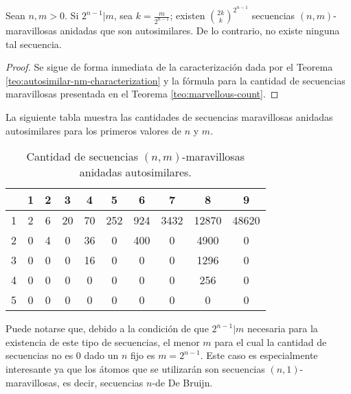 \documentclass[11pt]{article}
\begin{document}
\begin{coro} \label{coro:autosimilar-nm-count}
	Sean $n, m > 0$.
	Si $2^{n-1} \vert m$, sea $k = \frac{m}{2^{n-1}}$; existen
	$\binom{2k}{k}^{2^{n-1}}$ secuencias $(n,m)$-maravillosas anidadas que son
	autosimilares.
	De lo contrario, no existe ninguna tal secuencia.
\end{coro}

\begin{proof}
	Se sigue de forma inmediata de la caracterización dada por el Teorema
	\ref{teo:autosimilar-nm-characterization} y la fórmula para la cantidad de
	secuencias maravillosas presentada en el Teorema \ref{teo:marvellous-count}.
\end{proof}

La siguiente tabla muestra las cantidades de secuencias maravillosas anidadas
autosimilares para los primeros valores de $n$ y $m$.

\begin{table}[H]
	\centering
	\begin{tabular}{ c | c | c | c | c | c | c | c | c | c }
		\diagbox{$n$}{$m$}	& 1 & 2 & 3  & 4  & 5   & 6   & 7    & 8     & 9     \\
		\hline
		1 & 2 & 6 & 20 & 70 & 252 & 924 & 3432 & 12870 & 48620
		\\ \hline
		2 & 0 & 4 & 0  & 36 & 0   & 400 & 0    & 4900  & 0     \\
		\hline
		3 & 0 & 0 & 0  & 16 & 0   & 0   & 0    & 1296  & 0     \\
		\hline
		4 & 0 & 0 & 0  & 0  & 0   & 0   & 0    & 256   & 0     \\
		\hline
		5 & 0 & 0 & 0  & 0  & 0   & 0   & 0    & 0     & 0
	\end{tabular}
	\caption{Cantidad de secuencias $(n,m)$-maravillosas anidadas autosimilares.}
\end{table}

Puede notarse que, debido a la condición de que $2^{n-1} \vert m$ necesaria
para la existencia de este tipo de secuencias, el menor $m$ para el cual la
cantidad de secuencias no es $0$ dado un $n$ fijo es $m = 2^{n-1}$. Este caso
es especialmente interesante ya que los átomos que se utilizarán son secuencias
$(n, 1)$-maravillosas, es decir, secuencias $n$-de De Bruijn.


{}

\end{document}
